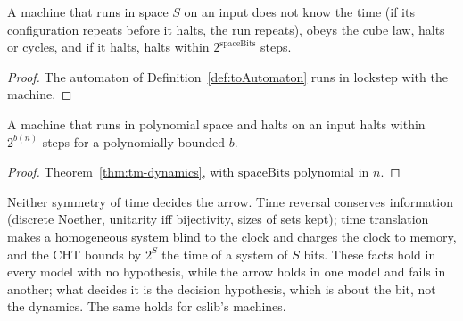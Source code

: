 \begin{theorem}
  \label{thm:tm-dynamics}
  \leanok
  A machine that runs in space $S$ on an input does not know the time (if its configuration repeats
  before it halts, the run repeats), obeys the cube law, halts or cycles, and if it halts, halts
  within $2^{\mathrm{spaceBits}}$ steps.
  \own{}
\end{theorem}

\begin{proof}
  \leanok
  The automaton of Definition~\ref{def:toAutomaton} runs in lockstep with the machine.
\end{proof}

\begin{theorem}
  \label{thm:cht-pspace}
  \leanok
  A machine that runs in polynomial space and halts on an input halts within $2^{b(n)}$ steps for a
  polynomially bounded $b$.
\end{theorem}

\begin{proof}
  \leanok
  Theorem~\ref{thm:tm-dynamics}, with $\mathrm{spaceBits}$ polynomial in $n$.
\end{proof}

\begin{theorem}
  \label{thm:localization-one}
  \leanok
  Neither symmetry of time decides the arrow. Time reversal conserves information (discrete Noether,
  unitarity iff bijectivity, sizes of sets kept); time translation makes a homogeneous system blind
  to the clock and charges the clock to memory, and the CHT bounds by $2^S$ the time of a system of
  $S$ bits. These facts hold in every model with no hypothesis, while the arrow holds in one model
  and fails in another; what decides it is the decision hypothesis, which is about the bit, not the
  dynamics. The same holds for cslib's machines.
  \own{}
\end{theorem}

